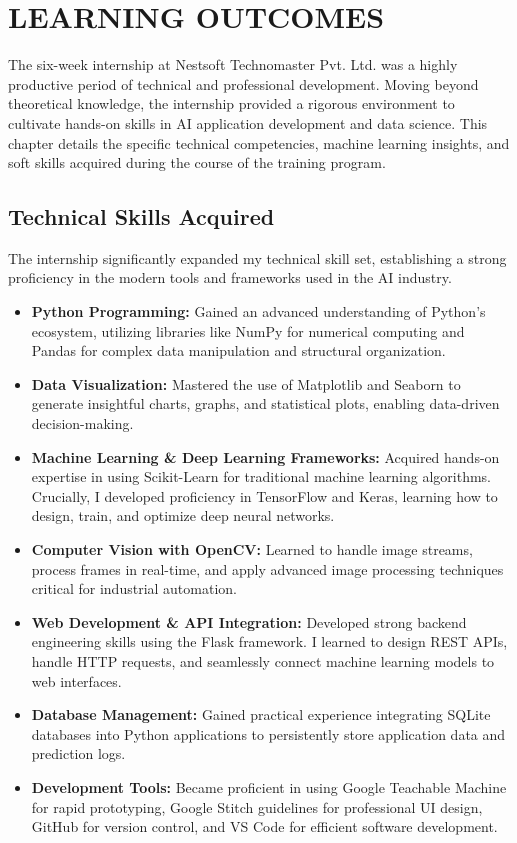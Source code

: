 \chapter{LEARNING OUTCOMES}

The six-week internship at Nestsoft Technomaster Pvt. Ltd. was a highly productive period of technical and professional development. Moving beyond theoretical knowledge, the internship provided a rigorous environment to cultivate hands-on skills in AI application development and data science. This chapter details the specific technical competencies, machine learning insights, and soft skills acquired during the course of the training program.

\section{Technical Skills Acquired}

The internship significantly expanded my technical skill set, establishing a strong proficiency in the modern tools and frameworks used in the AI industry.

\begin{itemize}[leftmargin=1.5cm]
    \item \textbf{Python Programming:} Gained an advanced understanding of Python's ecosystem, utilizing libraries like NumPy for numerical computing and Pandas for complex data manipulation and structural organization.
    \item \textbf{Data Visualization:} Mastered the use of Matplotlib and Seaborn to generate insightful charts, graphs, and statistical plots, enabling data-driven decision-making.
    \item \textbf{Machine Learning \& Deep Learning Frameworks:} Acquired hands-on expertise in using Scikit-Learn for traditional machine learning algorithms. Crucially, I developed proficiency in TensorFlow and Keras, learning how to design, train, and optimize deep neural networks.
    \item \textbf{Computer Vision with OpenCV:} Learned to handle image streams, process frames in real-time, and apply advanced image processing techniques critical for industrial automation.
    \item \textbf{Web Development \& API Integration:} Developed strong backend engineering skills using the Flask framework. I learned to design REST APIs, handle HTTP requests, and seamlessly connect machine learning models to web interfaces.
    \item \textbf{Database Management:} Gained practical experience integrating SQLite databases into Python applications to persistently store application data and prediction logs.
    \item \textbf{Development Tools:} Became proficient in using Google Teachable Machine for rapid prototyping, Google Stitch guidelines for professional UI design, GitHub for version control, and VS Code for efficient software development.
\end{itemize}

